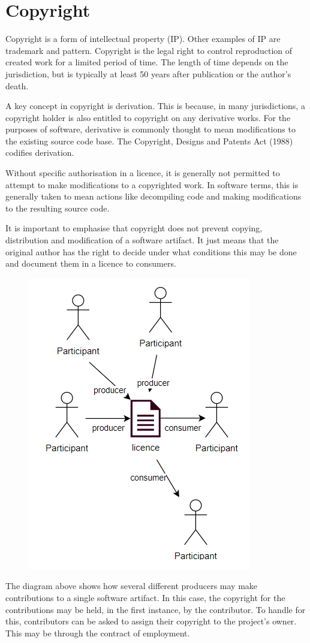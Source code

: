 \documentclass[a4paper, openany]{memoir}
\begin{document}
\section{Copyright}
Copyright is a form of intellectual property (IP). Other examples of IP are trademark and pattern. Copyright is the legal right to control reproduction of created work for a limited period of time. The length of time depends on the jurisdiction, but is typically at least 50 years after publication or the author's death.

A key concept in copyright is derivation. This is because, in many jurisdictions, a copyright holder is also entitled to copyright on any derivative works. For the purposes of software, derivative is commonly thought to mean modifications to the existing source code base. The Copyright, Designs and Patents Act (1988) codifies derivation.

Without specific authorisation in a licence, it is generally not permitted to attempt to make modifications to a copyrighted work. In software terms, this is generally taken to mean actions like decompiling code and making modifications to the resulting source code. 

It is important to emphasise that copyright does not prevent copying, distribution and modification of a software artifact. It just means that the original author has the right to decide under what conditions this may be done and document them in a licence to consumers.

\begin{figure}[H]
    \centering
    \includegraphics[scale=0.7]{src/17.2 contributors copyright.PNG}
\end{figure}
\noindent The diagram above shows how several different producers may make contributions to a single software artifact. In this case, the copyright for the contributions may be held, in the first instance, by the contributor. To handle for this, contributors can be asked to assign their copyright to the project's owner. This may be through the contract of employment. 
\end{document}
